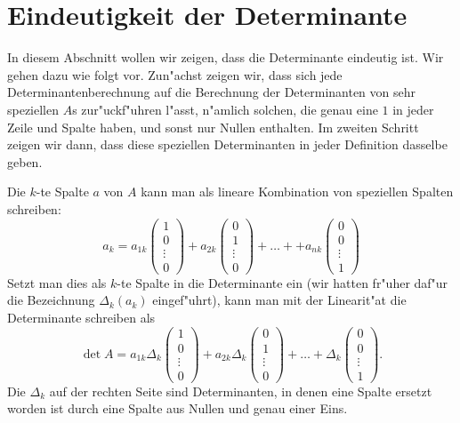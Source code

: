 \section{Eindeutigkeit der Determinante\label{deteindeutig}}
In diesem Abschnitt wollen wir zeigen, dass die Determinante
eindeutig ist. Wir gehen dazu wie folgt vor. Zun"achst zeigen wir,
dass sich jede Determinantenberechnung auf die Berechnung der Determinanten
von sehr speziellen $A$s zur"uckf"uhren l"asst, n"amlich solchen,
die genau eine $1$ in jeder Zeile und Spalte haben, und sonst nur
Nullen enthalten. Im zweiten Schritt zeigen wir dann, dass diese
speziellen Determinanten in jeder Definition dasselbe geben.

Die $k$-te Spalte $a$ von $A$ kann man als lineare Kombination von
speziellen Spalten schreiben:
\[
a_k=a_{1k}
\begin{pmatrix}
1\\0\\\vdots\\0
\end{pmatrix}
+a_{2k}
\begin{pmatrix}
0\\1\\\vdots\\0
\end{pmatrix}
+\dots+
+a_{nk}
\begin{pmatrix}
0\\0\\\vdots\\1
\end{pmatrix}
\]
Setzt man dies als $k$-te Spalte in die Determinante ein (wir hatten fr"uher
daf"ur die Bezeichnung $\Delta_k(a_k)$ eingef"uhrt), kann man mit
der Linearit"at  die Determinante schreiben als
\[
\det A=a_{1k}\Delta_k\left(
\begin{matrix}
1\\0\\\vdots\\0
\end{matrix}
\right)
+a_{2k}
\Delta_k\left(
\begin{matrix}
0\\1\\\vdots\\0
\end{matrix}
\right)+\dots+
\Delta_k\left(
\begin{matrix}
0\\0\\\vdots\\1
\end{matrix}
\right).
\]
Die $\Delta_k$ auf der rechten Seite sind Determinanten, in denen 
eine Spalte ersetzt worden ist durch eine Spalte aus Nullen und genau
einer Eins.

